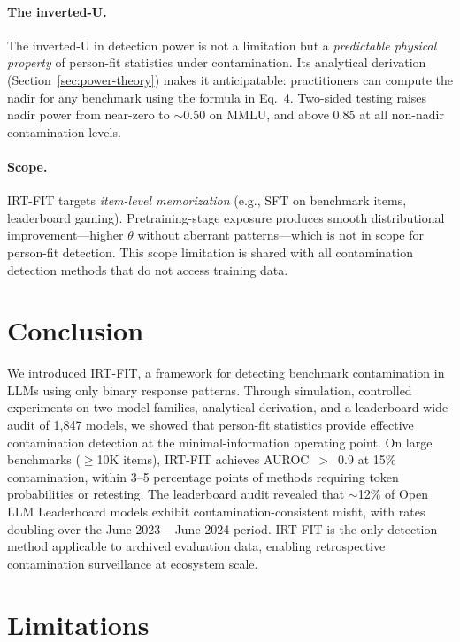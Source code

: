 \documentclass[11pt,a4paper]{article}
\begin{document}
\paragraph{The inverted-U.}
The inverted-U in detection power is not a limitation but a \emph{predictable physical property} of person-fit statistics under contamination.
Its analytical derivation (Section~\ref{sec:power-theory}) makes it anticipatable: practitioners can compute the nadir for any benchmark using the formula in Eq.~4.
Two-sided testing raises nadir power from near-zero to $\sim$0.50 on MMLU, and above 0.85 at all non-nadir contamination levels.

\paragraph{Scope.}
IRT-FIT targets \emph{item-level memorization} (e.g., SFT on benchmark items, leaderboard gaming).
Pretraining-stage exposure produces smooth distributional improvement---higher $\theta$ without aberrant patterns---which is not in scope for person-fit detection.
This scope limitation is shared with all contamination detection methods that do not access training data.

\section{Conclusion}

We introduced IRT-FIT, a framework for detecting benchmark contamination in LLMs using only binary response patterns.
Through simulation, controlled experiments on two model families, analytical derivation, and a leaderboard-wide audit of 1{,}847 models, we showed that person-fit statistics provide effective contamination detection at the minimal-information operating point.
On large benchmarks ($\geq$10K items), IRT-FIT achieves AUROC~$>$~0.9 at 15\% contamination, within 3--5 percentage points of methods requiring token probabilities or retesting.
The leaderboard audit revealed that $\sim$12\% of Open LLM Leaderboard models exhibit contamination-consistent misfit, with rates doubling over the June 2023 -- June 2024 period.
IRT-FIT is the only detection method applicable to archived evaluation data, enabling retrospective contamination surveillance at ecosystem scale.

\section*{Limitations}
\end{document}
